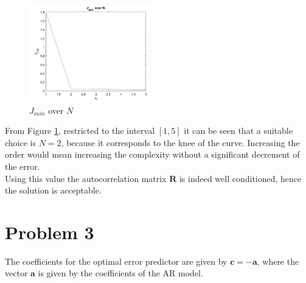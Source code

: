 \documentclass[a4paper, 12pt]{report}
\begin{document}
\begin{itemize}
\begin{figure}[H]
	\centering
	\includegraphics[width=0.5\textwidth]{choiceofn}
	\caption{$J_{min}$ over $N$}
	\label{fig:choiceofn}
\end{figure}

From Figure \ref{fig:choiceofn}, restricted to the interval $[1,5]$ it can be seen that a suitable choice is $N=2$, because it corresponds to the knee of the curve. Increasing the order would mean increasing the complexity without a significant decrement of the error.  \\
Using this value the autocorrelation matrix $\mathbf{R}$ is indeed well conditioned, hence the solution is acceptable.
\end{itemize}

\section*{Problem 3}
The coefficients for the optimal error predictor are given by $ \mathbf{c} = -\mathbf{a}$, where the vector $\mathbf{a}$ is given by the coefficients of the AR model.
\end{document}
